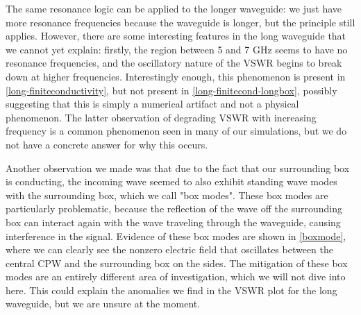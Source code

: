The same resonance logic can be applied to the longer waveguide: we just have more resonance frequencies because the
waveguide is longer, but the principle still applies. However, there are some interesting features in the
long waveguide that we cannot yet explain: firstly, the region between 5 and 7 GHz seems to have no resonance
frequencies, and the oscillatory nature of the VSWR begins to break down at higher frequencies. Interestingly
enough, this phenomenon is present in \cref{long-finiteconductivity}, but not present in
\cref{long-finitecond-longbox}, possibly suggesting that this is simply a numerical artifact and not a
physical phenomenon. The latter observation of degrading VSWR with increasing frequency is a common phenomenon 
seen in many of our simulations, but we do not have a concrete answer for why this occurs. 

Another observation we made was that due to the fact that our surrounding box is conducting, the incoming
wave seemed to also exhibit standing wave modes with the surrounding box, which we call "box modes". These
box modes are particularly problematic, because the reflection of the wave off the surrounding box can
interact again with the wave traveling through the waveguide, causing interference in the signal. Evidence of
these box modes are shown in \cref{boxmode}, where we can clearly see the nonzero electric field that
oscillates between the central CPW and the surrounding box on the sides. The mitigation of these box modes
are an entirely different area of investigation, which we will not dive into here. This could explain the
anomalies we find in the VSWR plot for the long waveguide, but we are unsure at the moment. 

